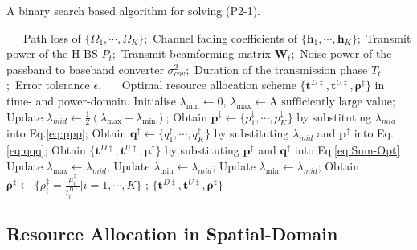 \documentclass[12pt,draft,onecolumn,journal]{IEEEtran}
\begin{document}
\begin{algorithm}[!t]
	\caption{A binary search based algorithm for solving (P2-1).}
	\footnotesize
	\begin{algorithmic}[1]
		\REQUIRE ~~\
		Path loss of $\{\Omega_1,\cdots,\Omega_K\}$;\
		Channel fading coefficients of $\{\mathbf{h}_1,\cdots,\mathbf{h}_K\}$;\
		Transmit power of the H-BS $P_{t}$;\
		Transmit beamforming matrix $\mathbf{W}_t$;\
		Noise power of the passband to baseband converter $\sigma^2_{cov}$;\
		Duration of the transmission phase $T_t$;\
		Error tolerance $\epsilon$.
		\ENSURE ~~\
		Optimal resource allocation scheme $\{\mathbf{t}^{D\ddagger}, \mathbf{t}^{U\ddagger}, \boldsymbol{\rho}^{\ddagger}\}$ in time- and power-domain.
		\STATE Initialise $\lambda_{\min}\leftarrow 0$, $\lambda_{\max}\leftarrow \text{A sufficiently large value}$;
		\WHILE{$\lambda_{\max} - \lambda_{\min} > \epsilon$}
			\STATE Update $\lambda_{mid} \leftarrow \frac{1}{2}(\lambda_{\max} + \lambda_{\min})$;
			\STATE Obtain $\mathbf{p}^{\ddagger} \leftarrow \{p_1^{\ddagger}, \cdots, p_K^{\ddagger}\}$ by substituting $\lambda_{mid}$ into Eq.\eqref{eq:ppp};
				\STATE Obtain $\mathbf{q}^{\ddagger} \leftarrow \{q_1^{\ddagger}, \cdots, q_K^{\ddagger}\}$ by substituting $\lambda_{mid}$ and $\mathbf{p}^{\ddagger}$ into Eq.\eqref{eq:qqq};
				\STATE Obtain $\{\mathbf{t}^{D\ddagger}, \mathbf{t}^{U\ddagger}, \boldsymbol{\mu}^{\ddagger}\}$ by substituting $\mathbf{p}^{\ddagger}$ and $\mathbf{q}^{\ddagger}$ into Eq.\eqref{eq:Sum-Opt}
				\IF{$\sum_{i=1}^Kt_i^{D\ddagger} + t_i^{U\ddagger}\leq T_t$} 
					\STATE Update $\lambda_{\max} \leftarrow \lambda_{mid}$;
				\ELSE 
					\STATE Update $\lambda_{\min} \leftarrow \lambda_{mid}$;
				\ENDIF
			\ELSE
					\STATE Update $\lambda_{\min}\leftarrow\lambda_{mid}$;
			\ENDIF
		\ENDWHILE
		\STATE Obtain $\boldsymbol{\rho}^{\ddagger} \leftarrow \{\rho_i^{\ddagger} = \frac{\mu_i^{\ddagger}}{t_i^{D\ddagger}} | i=1,\cdots, K\}$ ;
		\RETURN $\{\mathbf{t}^{D\ddagger}, \mathbf{t}^{U\ddagger}, \boldsymbol{\rho}^{\ddagger}\}$
	\end{algorithmic}
\end{algorithm}


\subsection{Resource Allocation in Spatial-Domain}
\end{document}

